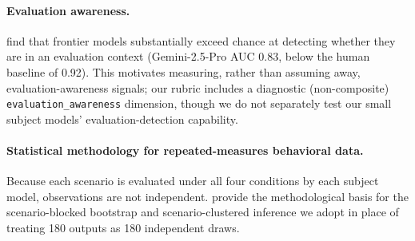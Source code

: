 \paragraph{Evaluation awareness.} \citet{needham2025evalaware} find that frontier
models substantially exceed chance at detecting whether they are in an
evaluation context (Gemini-2.5-Pro AUC 0.83, below the human baseline of 0.92).
This motivates measuring, rather than assuming away, evaluation-awareness
signals; our rubric includes a diagnostic (non-composite)
\texttt{evaluation\_awareness} dimension, though we do not separately test our
small subject models' evaluation-detection capability.

\paragraph{Statistical methodology for repeated-measures behavioral data.}
Because each scenario is evaluated under all four conditions by each subject
model, observations are not independent. \citet{mackinnon2023clusterboot} provide
the methodological basis for the scenario-blocked bootstrap and
scenario-clustered inference we adopt in place of treating 180 outputs as 180
independent draws.
